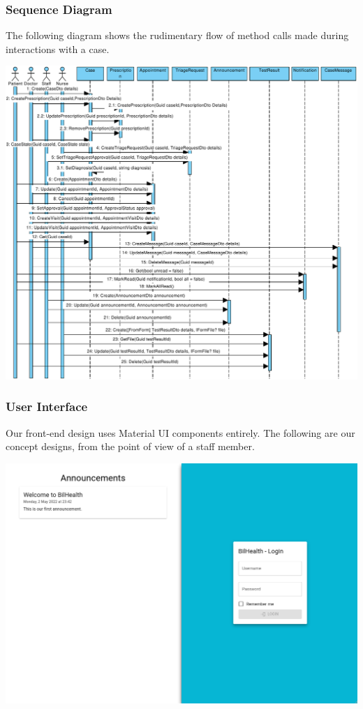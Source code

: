 \documentclass[a4paper, 12pt, titlepage]{article}
\begin{document}
  \subsubsection{Sequence Diagram}

  The following diagram shows the rudimentary flow of method calls made during interactions with a case.

  \includegraphics[width=\linewidth]{sequence_diag}

  \pagebreak
  \subsubsection{User Interface}

  Our front-end design uses Material UI components entirely.
  The following are our concept designs, from the point of view of a staff member.

  \includegraphics[width=\linewidth]{uim_login.png}
\end{document}

